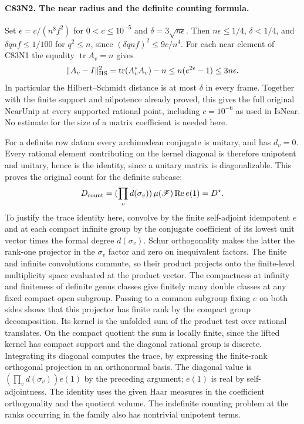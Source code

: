 \paragraph{C83N2. The near radius and the definite counting formula.}
Set $\epsilon=c/(n^8 f^2)$ for $0<c\le10^{-5}$ and
$\delta=3\sqrt{n\epsilon}$. Then $n\epsilon\le1/4$,
$\delta<1/4$, and $\delta qnf\le1/100$ for $q^2\le n$,
since $(\delta qnf)^2\le9c/n^4$. For each near element of
C83N1 the equality $\operatorname{tr}A_v=n$ gives
\[
 \|A_v-I\|_{\rm HS}^2
 =\operatorname{tr}(A_v^*A_v)-n
 \le n(e^{2\epsilon}-1)\le 3n\epsilon .
\]
In particular the Hilbert--Schmidt distance is at most $\delta$
in every frame. Together with the finite support and nilpotence
already proved, this gives the full original $\mathrm{NearUnip}$
at every supported rational point, including $c=10^{-6}$ as used
in $\mathrm{IsNear}$. No estimate for the size of a matrix
coefficient is needed here.

For a definite row datum every archimedean conjugate is unitary,
and has $d_v=0$. Every rational element contributing on the
kernel diagonal is therefore unipotent and unitary, hence is
the identity, since a unitary matrix is diagonalizable.
This proves the original count for the definite subcase:
\[
  D_{\rm count}=(\prod_v d(\sigma_v))\,
       \mu(\mathscr F)\operatorname{Re} e(1)=D^\star .
\]
To justify the trace identity here, convolve by the finite
self-adjoint idempotent $e$ and at each compact infinite group
by the conjugate coefficient of its lowest unit vector times
the formal degree $d(\sigma_v)$. Schur orthogonality makes
the latter the rank-one projector in the $\sigma_v$ factor
and zero on inequivalent factors. The finite and infinite
convolutions commute, so their product projects onto the
finite-level multiplicity space evaluated at the product vector.
The compactness at infinity and finiteness of definite genus
classes give finitely many double classes at any fixed compact
open subgroup. Passing to a common subgroup fixing $e$ on both
sides shows that this projector has finite rank by the compact
group decomposition. Its kernel is the unfolded sum of the
product test over rational translates. On the compact quotient
the sum is locally finite, since the lifted kernel has compact
support and the diagonal rational group is discrete. Integrating
its diagonal computes the trace, by expressing the finite-rank
orthogonal projection in an orthonormal basis. The diagonal
value is $(\prod_v d(\sigma_v))e(1)$ by the preceding argument;
$e(1)$ is real by self-adjointness. The identity uses the given
Haar measures in the coefficient orthogonality and the quotient
volume. The indefinite counting problem at the ranks occurring
in the family also has nontrivial unipotent terms.

